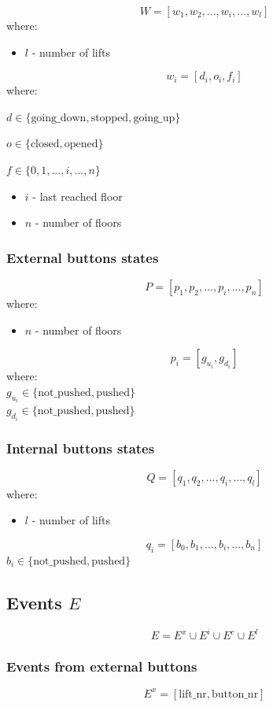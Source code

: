 \documentclass[12pt]{article}
\begin{document}
\[ W=[w_1, w_2, ..., w_i, ..., w_l ]\]
where:
\begin{itemize}
  \item \(l\) - number of lifts
\end{itemize}

\[ w_i = [d_i, o_i, f_i] \]
where:

\(d \in \{\text{going\_down},\text{stopped},\text{going\_up}\}\)

\(o \in \{\text{closed},\text{opened}\}\)

\(f \in \{0,1,...,i,...,n\}\)
\begin{itemize}
  \item \(i\) - last reached floor
  \item \(n\) - number of floors
\end{itemize}


\subsubsection{External buttons states}

\[ P = [p_1, p_2, ..., p_i, ..., p_n] \]
where:
\begin{itemize}
  \item \(n\) - number of floors
\end{itemize}

\[ p_i = [g_{u_i}, g_{d_i}] \]
where:\\
\(g_{u_i} \in \{\text{not\_pushed},\text{pushed}\}\)\\
\(g_{d_i} \in \{\text{not\_pushed},\text{pushed}\}\)


\subsubsection{Internal buttons states}
\[ Q = [q_1, q_2, ..., q_i, ..., q_l] \]
where:
\begin{itemize}
  \item \(l\) - number of lifts
\end{itemize}
\[q_i = [b_0, b_1, ..., b_i, ..., b_n] \]
\(b_i \in \{\text{not\_pushed},\text{pushed}\} \)

\newpage

\subsection{Events \(E\)}

\[ E = E^x \cup E^i \cup E^c \cup E^l \]

\subsubsection{Events from external buttons}
\[ E^x = [\text{lift\_nr},\text{button\_nr}] \]
\end{document}
